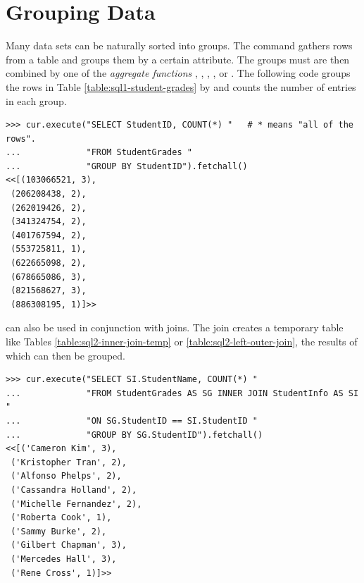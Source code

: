 \section*{Grouping Data} %


Many data sets can be naturally sorted into groups.
The  command gathers rows from a table and groups them by a certain attribute.
The groups must are then combined by one of the \emph{aggregate functions} , , , , or .
The following code groups the rows in Table \ref{table:sql1-student-grades} by  and counts the number of entries in each group.

\begin{lstlisting}
>>> cur.execute("SELECT StudentID, COUNT(*) "   # * means "all of the rows".
...             "FROM StudentGrades "
...             "GROUP BY StudentID").fetchall()
<<[(103066521, 3),
 (206208438, 2),
 (262019426, 2),
 (341324754, 2),
 (401767594, 2),
 (553725811, 1),
 (622665098, 2),
 (678665086, 3),
 (821568627, 3),
 (886308195, 1)]>>
\end{lstlisting}

 can also be used in conjunction with joins.
The join creates a temporary table like Tables \ref{table:sql2-inner-join-temp} or \ref{table:sql2-left-outer-join}, the results of which can then be grouped.

\begin{lstlisting}
>>> cur.execute("SELECT SI.StudentName, COUNT(*) "
...             "FROM StudentGrades AS SG INNER JOIN StudentInfo AS SI "
...             "ON SG.StudentID == SI.StudentID "
...             "GROUP BY SG.StudentID").fetchall()
<<[('Cameron Kim', 3),
 ('Kristopher Tran', 2),
 ('Alfonso Phelps', 2),
 ('Cassandra Holland', 2),
 ('Michelle Fernandez', 2),
 ('Roberta Cook', 1),
 ('Sammy Burke', 2),
 ('Gilbert Chapman', 3),
 ('Mercedes Hall', 3),
 ('Rene Cross', 1)]>>
\end{lstlisting}

